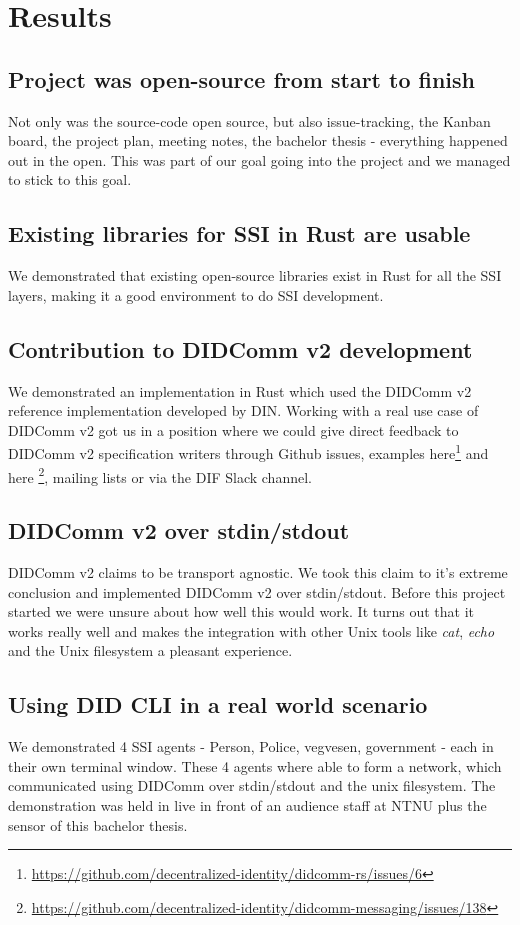\hypertarget{results}{%
\chapter{Results}\label{results}}


\section{Project was open-source from start to finish}

Not only was the source-code open source, but also issue-tracking, the Kanban board, the project plan, meeting notes, the bachelor thesis - everything happened out in the open. This was part of our goal going into the project and we managed to stick to this goal.


\section{Existing libraries for SSI in Rust are usable}

We demonstrated that existing open-source libraries exist in Rust for all the SSI layers, making it a good environment to do SSI development.


\section{Contribution to DIDComm v2 development}

We demonstrated an implementation in Rust which used the DIDComm v2 reference implementation developed by DIN. Working with a real use case of DIDComm v2 got us in a position where we could give direct feedback to DIDComm v2 specification writers through Github issues, examples here\footnote{\url{https://github.com/decentralized-identity/didcomm-rs/issues/6}} and here \footnote{\url{https://github.com/decentralized-identity/didcomm-messaging/issues/138}}, mailing lists or via the DIF Slack channel.


\section{DIDComm v2 over stdin/stdout}

DIDComm v2 claims to be transport agnostic. We took this claim to it's extreme conclusion and implemented DIDComm v2 over stdin/stdout. Before this project started we were unsure about how well this would work. It turns out that it works really well and makes the integration with other Unix tools like \textit{cat}, \textit{echo} and the Unix filesystem  a pleasant experience.



\section{Using DID CLI in a real world scenario}

We demonstrated 4 SSI agents - Person, Police, vegvesen, government - each in their own terminal window. These 4 agents where able to form a network, which communicated using DIDComm over stdin/stdout and the unix filesystem. The demonstration was held in live in front of an audience staff at NTNU plus the sensor of this bachelor thesis.
